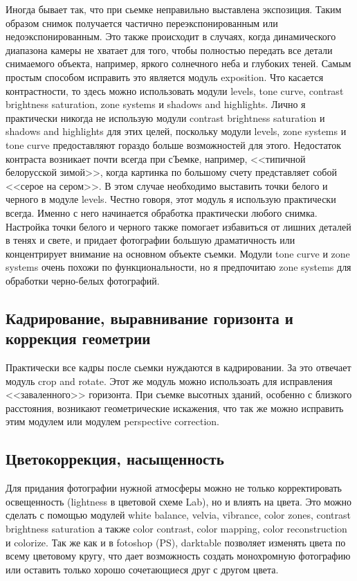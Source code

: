 \documentclass[10pt, a5paper]{article}
\begin{document}
Иногда бывает так, что при сьемке неправильно выставлена
экспозиция. Таким образом снимок получается частично
переэкспонированным или недоэкспонированным. Это также происходит в
случаях, когда динамического диапазона камеры не хватает для того,
чтобы полностью передать все детали снимаемого объекта, например,
яркого солнечного неба и глубоких теней. Самым простым способом
исправить это является модуль exposition. Что касается контрастности,
то здесь можно использовать модули levels, tone curve, contrast
brightness saturation, zone systems и shadows and highlights. Лично я
практически никогда не использую модули contrast brightness saturation
и shadows and highlights для этих целей, поскольку модули levels, zone
systems и tone curve предоставляют гораздо больше возможностей для
этого. Недостаток контраста возникает почти всегда при сЪемке, например,
<<типичной белорусской зимой>>, когда картинка по большому счету
представляет собой <<серое на сером>>. В этом случае необходимо
выставить точки белого и черного в модуле levels. Честно говоря, этот
модуль я использую практически всегда. Именно с него начинается
обработка практически любого снимка. Настройка точки белого и черного
также помогает избавиться от лишних деталей в тенях и свете, и придает
фотографии большую драматичность или концентрирует внимание на
основном объекте съемки. Модули tone curve и zone systems очень похожи
по функциональности, но я предпочитаю zone systems для обработки
черно-белых фотографий.

\subsection*{Кадрирование, выравнивание горизонта и коррекция геометрии}

Практически все кадры после сьемки нуждаются в кадрировании. За это
отвечает модуль crop and rotate. Этот же модуль можно использоать для
исправления <<заваленного>> горизонта. При съемке высотных зданий,
особенно с близкого расстояния, возникают геометрические искажения,
что так же можно исправить этим модулем или модулем perspective
correction.

\subsection*{Цветокоррекция, насыщенность}

Для придания фотографии нужной атмосферы можно не только
корректировать освещенность (lightness в цветовой схеме Lab), но и
влиять на цвета. Это можно сделать с помощью модулей white balance,
velvia, vibrance, color zones, contrast brightness saturation а также
color contrast, color mapping, color reconstruction и colorize. Так же
как и в fotoshop (PS), darktable позволяет изменять цвета по всему
цветовому кругу, что дает возможность создать монохромную фотографию
или оставить только хорошо сочетающиеся друг с другом цвета.
\end{document}
